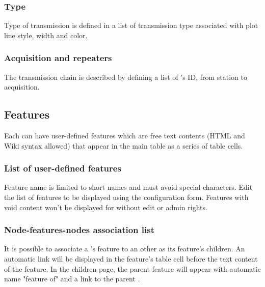 \subsubsection{Type}

Type of transmission is defined in a list of transmission type associated with plot line style, width and color.




\subsubsection{Acquisition and repeaters}

The transmission chain is described by defining a list of 's ID, from station to acquisition.


\subsection{Features}

Each  can have user-defined features which are free text contents (HTML and Wiki syntax allowed) that appear in the main table as a series of table cells.

\subsubsection{List of user-defined features}

Feature name is limited to short names and must avoid special characters. Edit the list of features to be displayed using the  configuration form. Features with void content won't be displayed for  without edit or admin rights.

\subsubsection{Node-features-nodes association list}

It is possible to associate a 's feature to an other  as its feature's children. An automatic link will be displayed in the feature's table cell before the text content of the feature. In the children  page, the parent feature will appear with automatic name "feature of" and a link to the parent .

